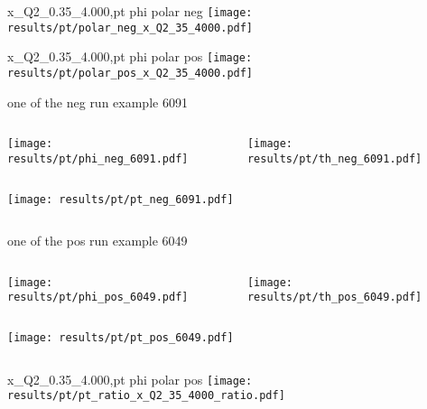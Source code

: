 \begin{frame}{x\_Q2\_0.35\_4.000,pt phi polar neg}
\texttt{[image: results/pt/polar\_neg\_x\_Q2\_35\_4000.pdf]}
\end{frame}
\begin{frame}{x\_Q2\_0.35\_4.000,pt phi polar pos}
\texttt{[image: results/pt/polar\_pos\_x\_Q2\_35\_4000.pdf]}
\end{frame}
\begin{frame}{one of the neg run example 6091}
\begin{columns}
\begin{column}[T]{0.5\textwidth}
\texttt{[image: results/pt/phi\_neg\_6091.pdf]}
\end{column}
\begin{column}[T]{0.5\textwidth}
\texttt{[image: results/pt/th\_neg\_6091.pdf]}
\end{column}
\end{columns}
\begin{columns}
\begin{column}[T]{0.5\textwidth}
\texttt{[image: results/pt/pt\_neg\_6091.pdf]}
\end{column}
\begin{column}[T]{0.5\textwidth}
\end{column}
\end{columns}
\end{frame}
\begin{frame}{one of the pos run example 6049}
\begin{columns}
\begin{column}[T]{0.5\textwidth}
\texttt{[image: results/pt/phi\_pos\_6049.pdf]}
\end{column}
\begin{column}[T]{0.5\textwidth}
\texttt{[image: results/pt/th\_pos\_6049.pdf]}
\end{column}
\end{columns}
\begin{columns}
\begin{column}[T]{0.5\textwidth}
\texttt{[image: results/pt/pt\_pos\_6049.pdf]}
\end{column}
\begin{column}[T]{0.5\textwidth}
\end{column}
\end{columns}
\end{frame}
\begin{frame}{x\_Q2\_0.35\_4.000,pt phi polar pos}
\texttt{[image: results/pt/pt\_ratio\_x\_Q2\_35\_4000\_ratio.pdf]}
\end{frame}
